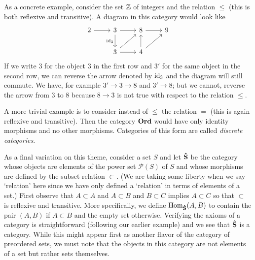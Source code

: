 \begin{example}
    As a concrete example, consider the set \(\mathbb{Z}\) of integers and the relation
    \(\leq\) (this is both reflexive and transitive). A diagram in this category
    would look like
    \[
        \begin{tikzcd}
            2 \arrow[r] & 3 \arrow[r] \arrow[d, "\id_3"'] & 8 \arrow[r]            & 9 \\
                        & 3 \arrow[r] \arrow[ru]          & 4 \arrow[u] \arrow[ru] &  
        \end{tikzcd}
    \]
    If we write \(3\) for the object \(3\) in the first row and \(3'\) for the
    same object in the second row, we can reverse the arrow denoted by \(\operatorname{id}_3\)
    and the diagram will still commute. We have, for example \(3' \to 3 \to 8\)
    and \(3' \to 8\); but we cannot, reverse the arrow from \(3\) to \(8\)
    because \(8 \to 3\) is not true with respect to the relation \(\leq\).

    A more trivial example is to consider instead of \(\leq\) the relation \(=\)
    (this is again reflexive and transitive). Then the category \(\mathbf{Ord}\)
    would have only identity morphisms and no other morphisms. Categories of
    this form are called \emph{discrete categories}.

    As a final variation on this theme, consider a set \(S\) and let
    \(\mathbf{\hat{S}}\) be the category whose objects are elements of the power
    set \(\mathcal{P}(S)\) of \(S\) and whose morphisms are defined by the
    subset relation \(\subset\). (We are taking some liberty when we say
    `relation' here since we have only defined a `relation' in terms of elements
    of a set.) First observe that \(A \subset A\) and \(A \subset B\) and \(B
    \subset C\) implies \(A \subset C\) so that \(\subset\) is reflexive and
    transitive. More specifically, we define \(\operatorname{Hom}_{\mathbf{\hat{S}}}(A, B)\) to
    contain the pair \((A, B)\) if \(A \subset B\) and the empty set otherwise.
    Verifying the axioms of a category is straightforward (following our earlier
    example) and we see that \(\mathbf{\hat{S}}\) is a category. While this might
    appear first as another flavor of the category of preordered sets, we must
    note that the objects in this category are not elements of a set but rather
    sets themselves.
\end{example}

